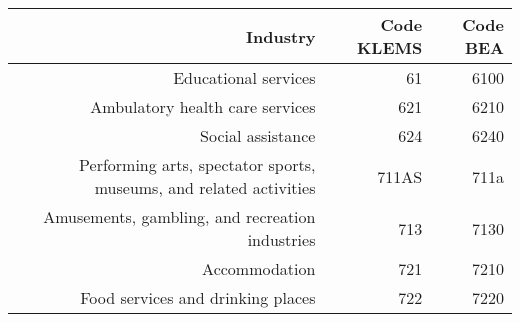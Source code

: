 \begin{table}[H]
    \begin{center}
        \begin{tabular}{rrr}
            Industry                                                             & Code KLEMS & Code BEA   \\%
            \hline\hline
            Educational services                                                 & 61          & 6100      \\%
            Ambulatory health care services                                      & 621         & 6210      \\%
            Social assistance                                                    & 624         & 6240      \\%
Performing arts, spectator sports, museums, and related activities   & 711AS       & 711a      \\%
Amusements, gambling, and recreation industries                      & 713         & 7130      \\%
Accommodation                                                        & 721         & 7210      \\%
Food services and drinking places                                    & 722         & 7220      \\%

\end{tabular}
\end{center}
\end{table}
